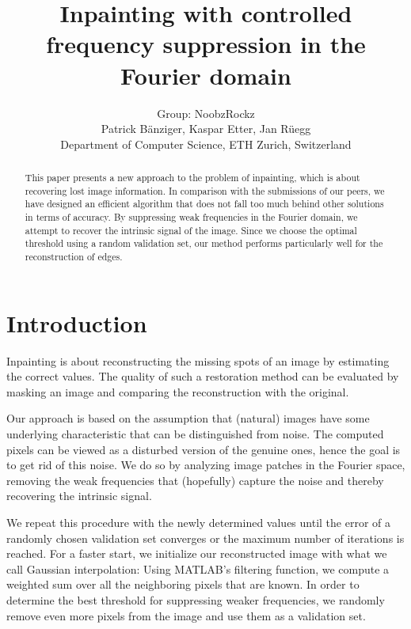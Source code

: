 \documentclass[10pt,conference,compsocconf]{IEEEtran}
\begin{document}
\title{Inpainting with controlled frequency suppression in the Fourier domain}

\author{
  Group: NoobzRockz\\
  Patrick Bänziger, Kaspar Etter, Jan Rüegg\\
  Department of Computer Science, ETH Zurich, Switzerland
}

\maketitle

\begin{abstract}
This paper presents a new approach to the problem of inpainting, which is about recovering lost image information. In comparison with the submissions of our peers, we have designed an efficient algorithm that does not fall too much behind other solutions in terms of accuracy. By suppressing weak frequencies in the Fourier domain, we attempt to recover the intrinsic signal of the image. Since we choose the optimal threshold using a random validation set, our method performs particularly well for the reconstruction of edges.
\end{abstract}

\section{Introduction}
Inpainting is about reconstructing the missing spots of an image by estimating the correct values. The quality of such a restoration method can be evaluated by masking an image and comparing the reconstruction with the original.

Our approach is based on the assumption that (natural) images have some underlying characteristic that can be distinguished from noise. The computed pixels can be viewed as a disturbed version of the genuine ones, hence the goal is to get rid of this noise. We do so by analyzing image patches in the Fourier space, removing the weak frequencies that (hopefully) capture the noise and thereby recovering the intrinsic signal.

We repeat this procedure with the newly determined values until the error of a randomly chosen validation set converges or the maximum number of iterations is reached. For a faster start, we initialize our reconstructed image with what we call Gaussian interpolation: Using MATLAB's filtering function, we compute a weighted sum over all the neighboring pixels that are known. In order to determine the best threshold for suppressing weaker frequencies, we randomly remove even more pixels from the image and use them as a validation set.
\end{document}
